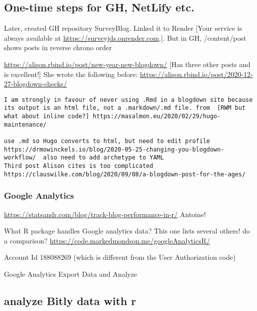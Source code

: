 \documentclass[
]{article}
\begin{document}
\hypertarget{one-time-steps-for-gh-netlify-etc.}{%
\subsection{One-time steps for GH, NetLify
etc.}\label{one-time-steps-for-gh-netlify-etc.}}

Later, created GH repository SurveyBlog. Linked it to Render {[}Your
service is always available at \url{https://surveyjds.onrender.com}.{]}.
But in GH, /content/post shows posts in reverse chrono order

\url{https://alison.rbind.io/post/new-year-new-blogdown/} {[}Has three
other posts and is excellent!{]} She wrote the following before:
\url{https://alison.rbind.io/post/2020-12-27-blogdown-checks/}

\begin{verbatim}
I am strongly in favour of never using .Rmd in a blogdown site because its output is an html file, not a .markdown/.md file. from  [RWM but what about inline code?] https://masalmon.eu/2020/02/29/hugo-maintenance/

use .md so Hugo converts to html, but need to edit profile  https://drmowinckels.io/blog/2020-05-25-changing-you-blogdown-workflow/  also need to add archetype to YAML
Third post Alison cites is too complicated https://clauswilke.com/blog/2020/09/08/a-blogdown-post-for-the-ages/
\end{verbatim}

\hypertarget{google-analytics}{%
\subsubsection{Google Analytics}\label{google-analytics}}

\url{https://statsandr.com/blog/track-blog-performance-in-r/} Antoine!

What R package handles Google analytics data? This one lists several
others! do a comparison?
\url{https://code.markedmondson.me/googleAnalyticsR/}

Account Id 188088269 (which is different from the User Authorization
code)

Google Analytics Export Data and Analyze

\hypertarget{analyze-bitly-data-with-r}{%
\subsection{analyze Bitly data with r}\label{analyze-bitly-data-with-r}}
\end{document}
